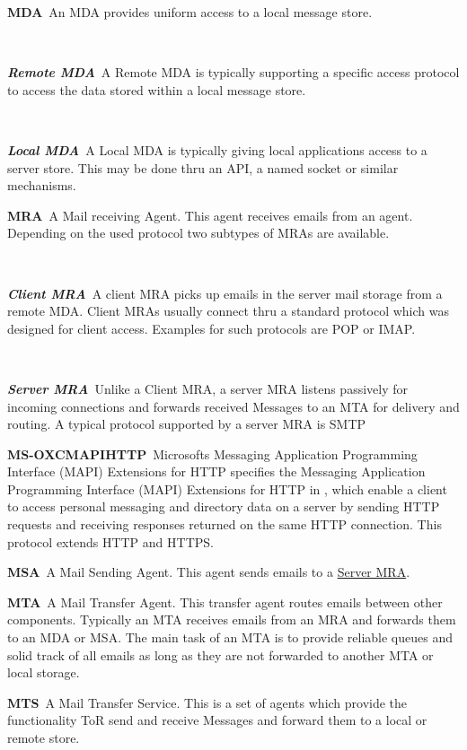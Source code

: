 \documentclass[a4paper,appendixprefix,pdfusetitle,twocolumn,fontsize=8pt,draft,DIV=calc]{scrbook}
\newenvironment{entry}{\par\leavevmode\hangpara{1.5mm}{1}\ignorespaces}{\RaggedRight\par}
\newcommand*{\mainentry}[2]{{\bfseries{#1\label{def:#1}}}~#2\par}
\newcommand*{\subentry}[2]{\par~\begin{minipage}{\columnwidth-0.6cm}{\bfseries{\itshape{#1\label{def:#1}}}}~#2\end{minipage}}
\newcommand*{\defref}[1]{\hyperref[def:#1]{#1}}
\begin{document}
\begin{entry}
	\mainentry{MDA}{An MDA provides uniform access to a local message store.}
	\subentry{Remote MDA}{A Remote MDA is typically supporting a specific access protocol to access the data stored within a local message store.}
	\subentry{Local MDA}{A Local MDA is typically giving local applications access to a server store. This may be done thru an API, a named socket or similar mechanisms.}
\end{entry}

\begin{entry}
	\mainentry{MRA}{A Mail receiving Agent. This agent receives emails from an agent. Depending on the used protocol two subtypes of MRAs are available.}
	\subentry{Client MRA}{A client MRA picks up emails in the server mail storage from a remote MDA. Client MRAs usually connect thru a standard protocol which was designed for client access. Examples for such protocols are POP or IMAP.}
	\subentry{Server MRA}{Unlike a Client MRA, a server MRA listens passively for incoming connections and forwards received Messages to an MTA for delivery and routing. A typical protocol supported by a server MRA is SMTP}
\end{entry}

\begin{entry}
	\mainentry{MS-OXCMAPIHTTP}{Microsofts Messaging Application Programming Interface (MAPI) 
		Extensions for HTTP specifies the Messaging Application Programming Interface (MAPI) Extensions for HTTP in \cite{ms-oxcmapihttp}, which enable a client to access personal messaging and directory data on a server by sending HTTP requests and receiving responses returned on the same HTTP connection. This protocol extends HTTP and HTTPS.}
\end{entry}

\begin{entry}
	\mainentry{MSA}{A Mail Sending Agent. This agent sends emails to a \defref{Server MRA}. }
\end{entry}

\begin{entry}
	\mainentry{MTA}{A Mail Transfer Agent. This transfer agent routes emails between other components. Typically an MTA receives emails from an MRA and forwards them to an MDA or MSA. The main task of an MTA is to provide reliable queues and solid track of all emails as long as they are not forwarded to another MTA or local storage.}
\end{entry}

\begin{entry}
	\mainentry{MTS}{A Mail Transfer Service. This is a set of agents which provide the functionality ToR send and receive Messages and forward them to a local or remote store.}
\end{entry}
\end{document}
